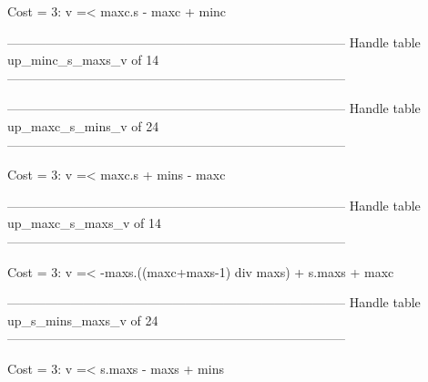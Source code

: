 Cost =  3:  v =< maxc.s - maxc + minc

--------------------------------------------------------------------------------
Handle table up_minc_s_maxs_v of 14
--------------------------------------------------------------------------------


--------------------------------------------------------------------------------
Handle table up_maxc_s_mins_v of 24
--------------------------------------------------------------------------------

Cost =  3:  v =< maxc.s + mins - maxc

--------------------------------------------------------------------------------
Handle table up_maxc_s_maxs_v of 14
--------------------------------------------------------------------------------

Cost =  3:  v =< -maxs.((maxc+maxs-1) div maxs) + s.maxs + maxc

--------------------------------------------------------------------------------
Handle table up_s_mins_maxs_v of 24
--------------------------------------------------------------------------------

Cost =  3:  v =< s.maxs - maxs + mins
